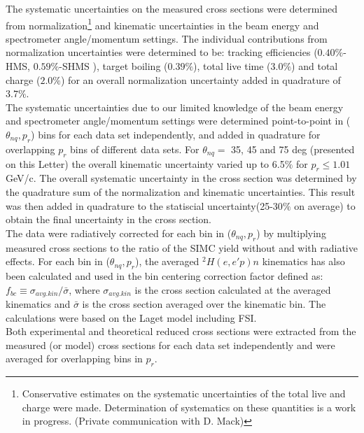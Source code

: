 \indent The systematic uncertainties on the measured cross sections were determined from normalization\footnote{Conservative estimates on the systematic uncertainties of the total live and charge were made.
Determination of systematics on these quantities is a work in progress. (Private communication with D. Mack)} and kinematic uncertainties in the beam energy and spectrometer angle/momentum settings. The individual
contributions from normalization uncertainties were determined to be: tracking efficiencies ($0.40 \%$-HMS, $0.59 \%$-SHMS ), target boiling ($0.39 \%$), total live time ($3.0 \%$) and total charge ($2.0\%$)
for an overall normalization uncertainty added in quadrature of $3.7 \%$. \\
\indent The systematic uncertainties due to our limited knowledge of the beam energy and spectrometer angle/momentum settings were determined point-to-point in ($\theta_{nq}, p_{r}$) bins for each data set independently, and added in quadrature for overlapping $p_{r}$ bins
of different data sets. For $\theta_{nq}=$ 35, 45 and 75 deg (presented on this Letter) the overall kinematic uncertainty varied up to 6.5$\%$ for $p_{r}\leq1.01$ GeV/c.
The overall systematic uncertainty in the cross section was determined by the quadrature sum of the normalization and kinematic uncertainties. This result was then added in quadrature
to the statiscial uncertainty(25-30$\%$ on average) to obtain the final uncertainty in the cross section. \\
\indent The data were radiatively corrected for each bin in ($\theta_{nq}, p_{r}$) by multiplying measured cross sections to the ratio of the SIMC yield without and with radiative effects.
For each bin in ($\theta_{nq}, p_{r}$), the averaged $^{2}H(e,e'p)n$ kinematics has also been calculated and used in the bin centering correction factor defined as:
$f_{bc} \equiv \sigma_{avg.kin} / \bar{\sigma}$, where $\sigma_{avg.kin}$ is the cross section calculated at the averaged kinematics and $\bar{\sigma}$ is the cross
section averaged over the kinematic bin. The calculations were based on the Laget model including FSI\cite{LAGET2005, PhysRevC.21.861}.\\
\indent Both experimental and theoretical reduced cross sections were extracted from the measured (or model) cross sections for each data set independently and were
averaged for overlapping bins in $p_{r}$. 
\onecolumngrid
